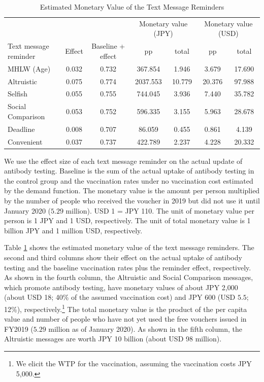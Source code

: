 \documentclass[
      12pt,
    a4paper
]{article}
\begin{document}
\begin{table}

\caption{\label{tab:monetary-value}Estimated Monetary Value of the Text Message Reminders}
\centering
\fontsize{9}{11}\selectfont
\begin{threeparttable}
\begin{tabular}[t]{lcccccc}
\toprule
\multicolumn{3}{c}{ } & \multicolumn{2}{c}{Monetary value (JPY)} & \multicolumn{2}{c}{Monetary value (USD)} \\
\cmidrule(l{3pt}r{3pt}){4-5} \cmidrule(l{3pt}r{3pt}){6-7}
Text message reminder & Effect & Baseline + effect & pp & total & pp & total\\
\midrule
MHLW (Age) & 0.032 & 0.732 & 367.854 & 1.946 & 3.679 & 17.690\\
Altruistic & 0.075 & 0.774 & 2037.553 & 10.779 & 20.376 & 97.988\\
Selfish & 0.055 & 0.755 & 744.045 & 3.936 & 7.440 & 35.782\\
Social Comparison & 0.053 & 0.752 & 596.335 & 3.155 & 5.963 & 28.678\\
Deadline & 0.008 & 0.707 & 86.059 & 0.455 & 0.861 & 4.139\\
Convenient & 0.037 & 0.737 & 422.789 & 2.237 & 4.228 & 20.332\\
\bottomrule
\end{tabular}
\begin{tablenotes}
\item We use the effect size of each text message reminder on the actual update of antibody testing. Baseline is the sum of the actual uptake of antibody testing in the control group and the vaccination rates under no vaccination cost estimated by the demand function. The monetary value is the amount per person multiplied by the number of people who received the voucher in 2019 but did not use it until January 2020 ($5.29$ million). USD 1 = JPY 110. The unit of monetary value per person is 1 JPY and 1 USD, respectively. The unit of total monetary value is 1 billion JPY and 1 million USD, respectively.
\end{tablenotes}
\end{threeparttable}
\end{table}

Table \ref{tab:monetary-value} shows the estimated monetary value of the text message reminders. The second and third columns show their effect on the actual uptake of antibody testing and the baseline vaccination rates plus the reminder effect, respectively. As shown in the fourth column, the Altruistic and Social Comparison messages, which promote antibody testing, have monetary values of about JPY 2,000 (about USD 18; 40\% of the assumed vaccination cost) and JPY 600 (USD \(5.5\); 12\%), respectively.\footnote{We elicit the WTP for the vaccination, assuming the vaccination costs JPY 5,000.} The total monetary value is the product of the per capita value and number of people who have not yet used the free vouchers issued in FY2019 (\(5.29\) million as of January 2020). As shown in the fifth column, the Altruistic messages are worth JPY 10 billion (about USD 98 million).
\end{document}
